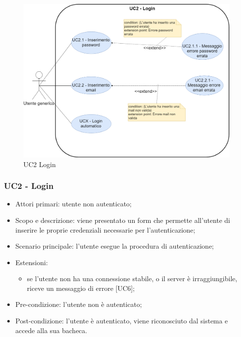 \begin{figure}[H]
	\centering
	\includegraphics[width=15cm,keepaspectratio]{../includes/pics/login_postRR.png}
	\caption{\label{fig:mission}UC2 Login}
\end{figure}

\subsubsection{UC2 - Login}
\begin{itemize}
	\item  Attori primari: utente non autenticato;
	\item  Scopo e descrizione: viene presentato un form che permette all'utente di inserire le proprie credenziali necessarie per l'autenticazione;
	\item  Scenario principale: l'utente esegue la procedura di autenticazione;
	\item  Estensioni:
		   \begin{itemize}
		   	    \item se l'utente non ha una connessione stabile, o il server è irraggiungibile, riceve un messaggio di errore [UC6];
		   \end{itemize}		    
	\item  Pre-condizione: l'utente non è autenticato;
	\item  Post-condizione: l'utente è autenticato, viene riconosciuto dal sistema e accede alla sua bacheca.
\end{itemize}
